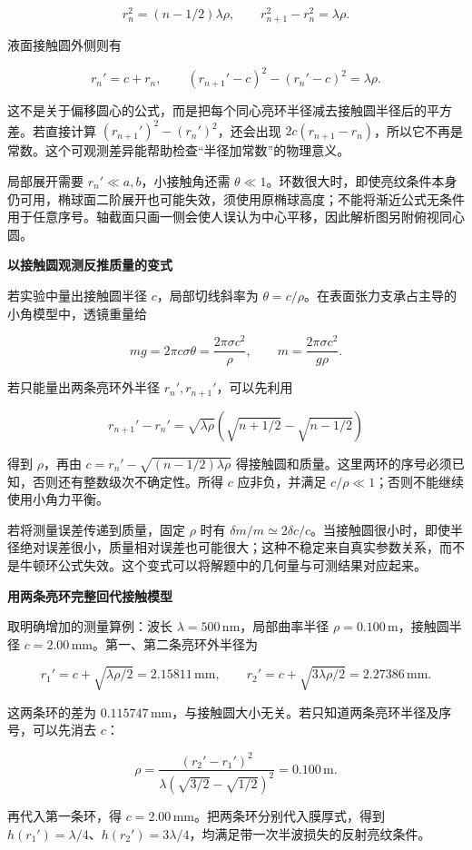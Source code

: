 \documentclass[12pt,a4paper,UTF8]{ctexart}
\begin{document}
\[r_n^2=(n-1/2)\lambda\rho,\qquad r_{n+1}^2-r_n^2=\lambda\rho.\]

液面接触圆外侧则有

\[r_n'=c+r_n,\qquad (r_{n+1}'-c)^2-(r_n'-c)^2=\lambda\rho.\]

这不是关于偏移圆心的公式，而是把每个同心亮环半径减去接触圆半径后的平方差。若直接计算
\((r_{n+1}')^2-(r_n')^2\)，还会出现
\(2c(r_{n+1}-r_n)\)，所以它不再是常数。这个可观测差异能帮助检查``半径加常数''的物理意义。

局部展开需要 \(r_n'\ll a,b\)，小接触角还需
\(\theta\ll1\)。环数很大时，即使亮纹条件本身仍可用，椭球面二阶展开也可能失效，须使用原椭球高度；不能将渐近公式无条件用于任意序号。轴截面只画一侧会使人误认为中心平移，因此解析图另附俯视同心圆。

\textbf{以接触圆观测反推质量的变式}

若实验中量出接触圆半径 \(c\)，局部切线斜率为
\(\theta=c/\rho\)。在表面张力支承占主导的小角模型中，透镜重量给

\[mg=2\pi c\sigma\theta=\frac{2\pi\sigma c^2}{\rho},\qquad m=\frac{2\pi\sigma c^2}{g\rho}.\]

若只能量出两条亮环外半径 \(r_n',r_{n+1}'\)，可以先利用

\[r_{n+1}'-r_n'=\sqrt{\lambda\rho}\left(\sqrt{n+1/2}-\sqrt{n-1/2}\right)\]

得到 \(\rho\)，再由 \(c=r_n'-\sqrt{(n-1/2)\lambda\rho}\)
得接触圆和质量。这里两环的序号必须已知，否则还有整数级次不确定性。所得
\(c\) 应非负，并满足 \(c/\rho\ll1\)；否则不能继续使用小角力平衡。

若将测量误差传递到质量，固定 \(\rho\) 时有
\(\delta m/m\simeq2\delta c/c\)。当接触圆很小时，即使半径绝对误差很小，质量相对误差也可能很大；这种不稳定来自真实参数关系，而不是牛顿环公式失效。这个变式可以将解题中的几何量与可测结果对应起来。

\textbf{用两条亮环完整回代接触模型}

取明确增加的测量算例：波长 \(\lambda=500\,\mathrm{nm}\)，局部曲率半径
\(\rho=0.100\,\mathrm m\)，接触圆半径
\(c=2.00\,\mathrm{mm}\)。第一、第二条亮环外半径为

\[r_1'=c+\sqrt{\lambda\rho/2}=2.15811\,\mathrm{mm},\qquad r_2'=c+\sqrt{3\lambda\rho/2}=2.27386\,\mathrm{mm}.\]

这两条环的差为
\(0.115747\,\mathrm{mm}\)，与接触圆大小无关。若只知道两条亮环半径及序号，可以先消去
\(c\)：

\[\rho=\frac{(r_2'-r_1')^2}{\lambda(\sqrt{3/2}-\sqrt{1/2})^2}=0.100\,\mathrm m.\]

再代入第一条环，得 \(c=2.00\,\mathrm{mm}\)。把两条环分别代入膜厚式，得到
\(h(r_1')=\lambda/4\)、\(h(r_2')=3\lambda/4\)，均满足带一次半波损失的反射亮纹条件。
\end{document}
